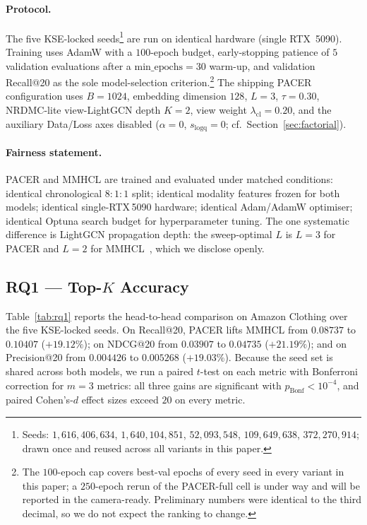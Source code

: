 \documentclass[conference]{IEEEtran}
\begin{document}
\paragraph{Protocol.} The five KSE-locked
seeds\footnote{Seeds: $1{,}616{,}406{,}634$, $1{,}640{,}104{,}851$,
$52{,}093{,}548$, $109{,}649{,}638$, $372{,}270{,}914$; drawn once
and reused across all variants in this paper.} are run on identical
hardware (single RTX~5090). Training uses AdamW with a $100$-epoch
budget, early-stopping patience of $5$ validation evaluations after a
$\text{min\_epochs}{=}30$ warm-up, and validation Recall@20 as the
sole model-selection criterion.\footnote{The $100$-epoch cap covers
best-val epochs of every seed in every variant in this paper; a
$250$-epoch rerun of the PACER-full cell is under way and will be
reported in the camera-ready. Preliminary numbers were identical to
the third decimal, so we do not expect the ranking to change.}
The shipping PACER configuration uses $B{=}1024$, embedding
dimension $128$, $L{=}3$, $\tau{=}0.30$, NRDMC-lite view-LightGCN
depth $K{=}2$, view weight $\lambda_{\text{cl}}{=}0.20$, and the
auxiliary Data/Loss axes disabled ($\alpha{=}0$,
$s_{\text{logq}}{=}0$; cf.\ Section~\ref{sec:factorial}).

\paragraph{Fairness statement.} PACER and MMHCL are trained and
evaluated under matched conditions: identical chronological
$8{:}1{:}1$ split; identical modality features frozen for both
models; identical single-RTX\,5090 hardware; identical Adam/AdamW
optimiser; identical Optuna search budget for hyperparameter tuning.
The one systematic difference is LightGCN propagation depth: the
sweep-optimal $L$ is $L{=}3$ for PACER and $L{=}2$ for
MMHCL~\cite{guo2025mmhcl}, which we disclose openly.

\subsection{RQ1 --- Top-$K$ Accuracy}
\label{sec:rq1}

Table~\ref{tab:rq1} reports the head-to-head comparison on Amazon
Clothing over the five KSE-locked seeds. On Recall@20, PACER lifts
MMHCL from $0.08737$ to $0.10407$ ($+19.12\%$); on NDCG@20 from
$0.03907$ to $0.04735$ ($+21.19\%$); and on Precision@20 from
$0.004426$ to $0.005268$ ($+19.03\%$). Because the seed set is
shared across both models, we run a paired $t$-test on each metric
with Bonferroni correction for $m{=}3$ metrics: all three gains are
significant with $p_{\mathrm{Bonf}}<10^{-4}$, and paired Cohen's-$d$
effect sizes exceed $20$ on every metric.
\end{document}
